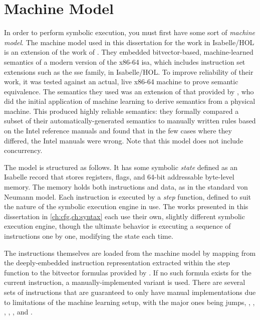 \section{Machine Model}\label{se:machine_model}
In order to perform symbolic execution,
you must first have some sort of \emph{machine model}.%
The machine model used in this dissertation for the work in Isabelle/HOL
is an extension of the work of \citet{roessle2019}.
They embedded bitvector-based, machine-learned semantics
of a modern version of the x86-64 \ac{isa},
which includes instruction set extensions such as the \ac{sse} family, in Isabelle/HOL.
To improve reliability of their work,
it was tested against an actual, live x86-64 machine to prove semantic equivalence.
The semantics they used was an extension of that provided by \citet{heule2016stratified},
who did the initial application of machine learning
to derive semantics from a physical machine.
This produced highly reliable semantics:
they formally compared a subset of their automatically-generated semantics
to manually written rules based on the Intel reference manuals
and found that in the few cases where they differed, the Intel manuals were wrong.
Note that this model does not include concurrency.

The model is structured as follows.
It has some symbolic \emph{state} defined as an Isabelle record
that stores registers, flags, and 64-bit addressable byte-level memory.
The memory holds both instructions and data, as in the standard von Neumann model.%
Each instruction is executed by a \emph{step} function,%
defined to suit the nature of the symbolic execution engine in use.
The works presented in this dissertation in \cref{ch:cfg,ch:syntax}
each use their own, slightly different symbolic execution engine,
though the ultimate behavior is executing a sequence of instructions one by one,
modifying the state each time.

The instructions themselves are loaded from the machine model
by mapping from the deeply-embedded instruction representation
extracted within the step function
to the bitvector formulas provided by \citet{roessle2019}.
If no such formula exists for the current instruction,
a manually-implemented variant is used.
There are several sets of instructions
that are guaranteed to only have manual implementations due to limitations
of the machine learning setup, with the major ones being
jumps, , , , ,
, and .

